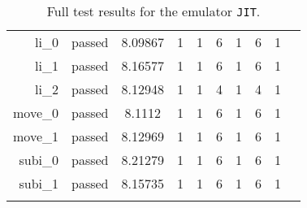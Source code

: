 \begin{longtable}{r|ccccccccc}
    li\_0 & passed & 8.09867 & 1 & 1 & 6 & 1 & 6 & 1 \\
    li\_1 & passed & 8.16577 & 1 & 1 & 6 & 1 & 6 & 1 \\
    li\_2 & passed & 8.12948 & 1 & 1 & 4 & 1 & 4 & 1 \\
    move\_0 & passed & 8.1112 & 1 & 1 & 6 & 1 & 6 & 1 \\
    move\_1 & passed & 8.12969 & 1 & 1 & 6 & 1 & 6 & 1 \\
    subi\_0 & passed & 8.21279 & 1 & 1 & 6 & 1 & 6 & 1 \\
    subi\_1 & passed & 8.15735 & 1 & 1 & 6 & 1 & 6 & 1 \\

    \bottomrule
    \caption{Full test results for the emulator \texttt{JIT}.}
    \label{tbl:full-test-output-jit}
\end{longtable}

